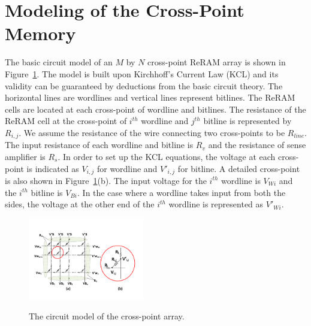 \section{Modeling of the Cross-Point Memory}\label{sec:model}


The basic circuit model of an $M$ by $N$ cross-point ReRAM array is shown
in Figure~\ref{fig:modeling}. The model is built upon Kirchhoff's Current
Law (KCL) and its validity can be guaranteed by deductions from the basic
circuit theory. The horizontal lines are wordlines and vertical lines
represent bitlines. The ReRAM cells are located at each cross-point of
wordline and bitlines. The resistance of the ReRAM cell at the cross-point
of $i^{th}$ wordline and $j^{th}$ bitline is represented by $R_{i,j}$. We
assume the resistance of the wire connecting two cross-points to be
$R_{line}$. The input resistance of each wordline and bitline is $R_v$ and
the resistance of sense amplifier is $R_s$. In order to set up the KCL
equations, the voltage at each cross-point is indicated as $V_{i,j}$ for
wordline and $V'_{i,j}$ for bitline. A detailed cross-point is also shown
in Figure~\ref{fig:modeling}(b). The input voltage for the $i^{th}$
wordline is $V_{Wi}$ and the $i^{th}$ bitline is $V_{Bi}$. In the case
where a wordline takes input from both the sides, the voltage at the other
end of the $i^{th}$ wordline is represented as $V'_{Wi}$.

\begin{figure}%
\centering
  \includegraphics[width=0.45\textwidth]{./figures/model_f.pdf}\\
  \caption{The circuit model of the cross-point array.}\label{fig:modeling}
  \vspace{-12pt}
\end{figure}

